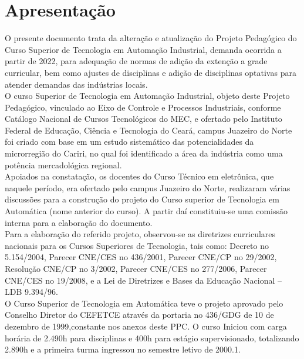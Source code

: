 \pagebreak

\chapter{Apresentação}
\OnehalfSpacing


O presente documento trata da alteração e atualização do Projeto Pedagógico do Curso Superior de Tecnologia em Automação Industrial, demanda ocorrida a partir de 2022, para adequação de normas de adição da extenção a grade curricular, bem como ajustes de disciplinas e adição de disciplinas optativas para atender demandas das indústrias locais.\\

O curso Superior de Tecnologia em Automação Industrial, objeto deste Projeto Pedagógico, vinculado ao Eixo de Controle e Processos Industriais, conforme Catálogo Nacional de Cursos Tecnológicos do MEC, e ofertado pelo Instituto Federal de Educação, Ciência e Tecnologia do Ceará, campus Juazeiro do Norte foi criado com base em um estudo sistemático das  potencialidades da microrregião do Cariri, no qual foi identificado a área da indústria como uma potência mercadológica regional.\\

Apoiados na constatação, os docentes do Curso Técnico em eletrônica, que naquele período, era ofertado pelo campus Juazeiro do Norte, realizaram várias discussões para a construção do projeto do Curso superior de Tecnologia em Automática (nome anterior do curso). A partir daí constituiu-se uma comissão interna para a elaboração do documento.\\

Para a elaboração do referido projeto, observou-se as diretrizes curriculares nacionais para os Cursos Superiores de Tecnologia, tais como: Decreto no 5.154/2004, Parecer CNE/CES no 436/2001, Parecer CNE/CP no 29/2002, Resolução CNE/CP no 3/2002, Parecer CNE/CES no 277/2006, Parecer CNE/CES no 19/2008, e a Lei de Diretrizes e Bases da Educação Nacional – LDB 9.394/96.\\

O Curso Superior de Tecnologia em Automática teve o projeto aprovado pelo Conselho Diretor do CEFETCE através da portaria no 436/GDG de 10 de dezembro de 1999,constante nos anexos deste PPC. O curso Iniciou com carga horária de 2.490h para disciplinas e 400h para estágio supervisionado, totalizando 2.890h e a primeira turma ingressou no semestre letivo de 2000.1.\\

